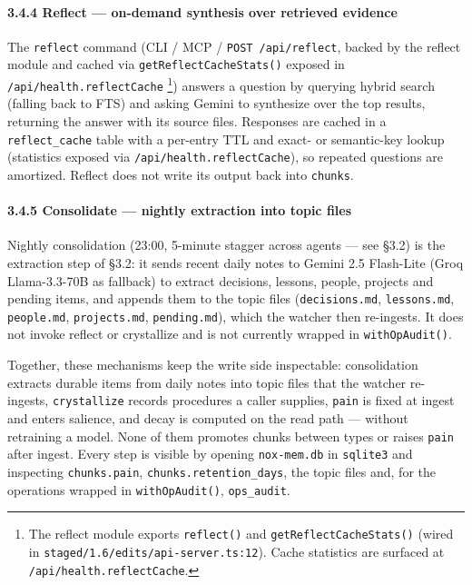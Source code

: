 \documentclass[
]{article}
\begin{document}
\paragraph{3.4.4 Reflect --- on-demand synthesis over retrieved
evidence}\label{reflect-on-demand-synthesis-over-retrieved-evidence}

The \texttt{reflect} command (CLI / MCP / \texttt{POST\ /api/reflect},
backed by the reflect module and cached via
\texttt{getReflectCacheStats()} exposed in
\texttt{/api/health.reflectCache} \footnote{The reflect module exports
  \texttt{reflect()} and \texttt{getReflectCacheStats()} (wired in
  \texttt{staged/1.6/edits/api-server.ts:12}). Cache statistics are
  surfaced at \texttt{/api/health.reflectCache}.}) answers a question by
querying hybrid search (falling back to FTS) and asking Gemini to
synthesize over the top results, returning the answer with its source
files. Responses are cached in a \texttt{reflect\_cache} table with a
per-entry TTL and exact- or semantic-key lookup (statistics exposed via
\texttt{/api/health.reflectCache}), so repeated questions are amortized.
Reflect does not write its output back into \texttt{chunks}.

\paragraph{3.4.5 Consolidate --- nightly extraction into topic
files}\label{consolidate-nightly-extraction-into-topic-files}

Nightly consolidation (23:00, 5-minute stagger across agents --- see
§3.2) is the extraction step of §3.2: it sends recent daily notes to
Gemini 2.5 Flash-Lite (Groq Llama-3.3-70B as fallback) to extract
decisions, lessons, people, projects and pending items, and appends them
to the topic files (\texttt{decisions.md}, \texttt{lessons.md},
\texttt{people.md}, \texttt{projects.md}, \texttt{pending.md}), which
the watcher then re-ingests. It does not invoke reflect or crystallize
and is not currently wrapped in \texttt{withOpAudit()}.

Together, these mechanisms keep the write side inspectable:
consolidation extracts durable items from daily notes into topic files
that the watcher re-ingests, \texttt{crystallize} records procedures a
caller supplies, \texttt{pain} is fixed at ingest and enters salience,
and decay is computed on the read path --- without retraining a model.
None of them promotes chunks between types or raises \texttt{pain} after
ingest. Every step is visible by opening \texttt{nox-mem.db} in
\texttt{sqlite3} and inspecting \texttt{chunks.pain},
\texttt{chunks.retention\_days}, the topic files and, for the operations
wrapped in \texttt{withOpAudit()}, \texttt{ops\_audit}.
\end{document}
